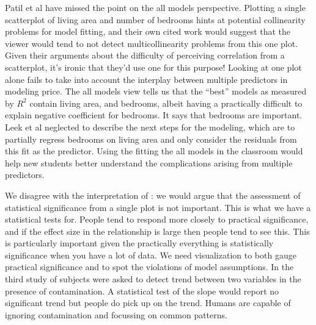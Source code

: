\documentclass[preprint]{imsart}
\begin{document}
Patil et al have missed the point on the all models perspective. Plotting a single scatterplot of living area and number of bedrooms hints at potential collinearity problems for model fitting, and their own cited work would suggest that the viewer would tend to not detect multicollinearity problems from this one plot. Given their arguments about the difficulty of perceiving correlation from a scatterplot, it's ironic that they'd use one for this purpose!  Looking at one plot alone fails to take into account the interplay between multiple predictors in modeling price. The all models view tells us that the ``best'' models as measured by $R^2$ contain living area, and bedrooms, albeit having a practically difficult to explain negative coefficient for bedrooms. It says that bedrooms are important. Leek et al neglected to describe the next steps for the modeling, which are to partially regress bedrooms on living area and only consider the residuals from this fit as the predictor. Using the fitting the all models in the classroom would help new students better understand the complications arising from multiple predictors.

We disagree with the interpretation of \cite{Fisher}: we would argue that the assessment of statistical significance from a single plot is not important. This is what we have a statistical tests for. People tend to respond more closely to practical significance, and if the effect size in the relationship is large then people tend to see this. This is particularly important given the practically everything is statistically significance when you have a lot of data. We need visualization to both gauge practical significance and to spot the violations of model assumptions. In the third study of \cite{majumder:2013} subjects were asked to detect trend between two variables in the presence of contamination. A statistical test of the slope would report no significant trend but people do pick up on the trend. Humans are capable of ignoring contamination and focussing on common patterns.

\end{document}
